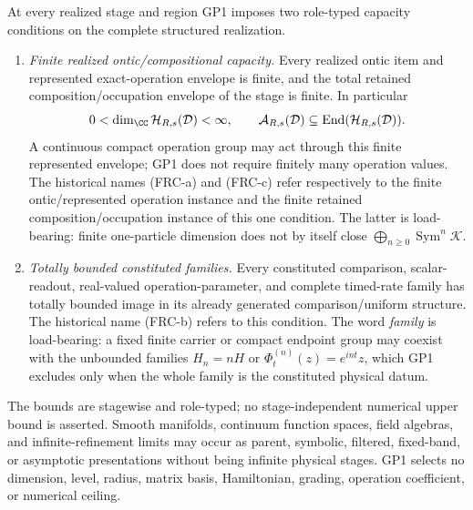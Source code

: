 \documentclass[12pt,a4paper]{article}
\begin{document}
\begin{mdframed}[style=postulatebox,nobreak=false]
\begin{postulate}
\label{p2:post:GP1}
At every realized stage and region GP1 imposes two role-typed capacity
conditions on the complete structured realization.
\begin{enumerate}[label=(\roman*),leftmargin=2em]
\item \emph{Finite realized ontic/compositional capacity.}  Every realized
ontic item and represented exact-operation envelope is finite, and the total
retained composition/occupation envelope of the stage is finite.  In
particular
\[
 0<\dim_{\CC}\mathcal H_{R,s}(\mathcal D)<\infty,
 \qquad
 \mathcal A_{R,s}(\mathcal D)\subseteq
 \operatorname{End}(\mathcal H_{R,s}(\mathcal D)).
\]
A continuous compact operation group may act through this finite represented
envelope; GP1 does not require finitely many operation values.  The historical
names (FRC-a) and (FRC-c) refer respectively to the finite ontic/represented
operation instance and the finite retained composition/occupation instance of
this one condition.  The latter is load-bearing: finite one-particle dimension
does not by itself close
\(\bigoplus_{n\ge0}\operatorname{Sym}^n\mathcal K\).

\item \emph{Totally bounded constituted families.}  Every constituted
comparison, scalar-readout, real-valued operation-parameter, and complete
timed-rate family has totally bounded image in its already generated
comparison/uniform structure.  The historical name (FRC-b) refers to this
condition.  The word \emph{family} is load-bearing: a fixed finite carrier or
compact endpoint group may coexist with the unbounded families
\(H_n=nH\) or \(\Phi_t^{(n)}(z)=e^{int}z\), which GP1 excludes only when the
whole family is the constituted physical datum.
\end{enumerate}
The bounds are stagewise and role-typed; no stage-independent numerical upper
bound is asserted.  Smooth manifolds, continuum function spaces, field
algebras, and infinite-refinement limits may occur as parent, symbolic,
filtered, fixed-band, or asymptotic presentations without being infinite
physical stages.  GP1 selects no dimension, level, radius, matrix basis,
Hamiltonian, grading, operation coefficient, or numerical ceiling.
\end{postulate}
\end{mdframed}
\end{document}
